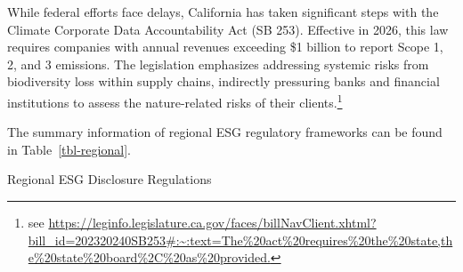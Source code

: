 \documentclass[
  authoryear]{elsarticle}
\begin{document}
While federal efforts face delays, California has taken significant
steps with the Climate Corporate Data Accountability Act (SB 253).
Effective in 2026, this law requires companies with annual revenues
exceeding \$1 billion to report Scope 1, 2, and 3 emissions. The
legislation emphasizes addressing systemic risks from biodiversity loss
within supply chains, indirectly pressuring banks and financial
institutions to assess the nature-related risks of their
clients.\footnote{see
  \url{https://leginfo.legislature.ca.gov/faces/billNavClient.xhtml?bill_id=202320240SB253\#:~:text=The\%20act\%20requires\%20the\%20state,the\%20state\%20board\%2C\%20as\%20provided.}}

The summary information of regional ESG regulatory frameworks can be
found in Table~\ref{tbl-regional}.

\begin{table}

\caption{\label{tbl-regional}Regional ESG Disclosure Regulations}

\centering{

\centering\begingroup\fontsize{11}{13}\selectfont

}
\end{table}
\end{document}
